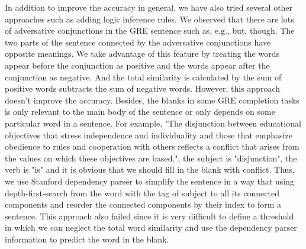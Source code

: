 \documentclass[11pt]{article}
\begin{document}
In addition to improve the accuracy in general, we have also tried several other approaches such as adding logic inference rules. We observed that there are lots of adversative conjunctions in the GRE sentence such as, e.g., but, though. The two parts of the sentence connected by the adversative conjunctions have opposite meanings. We take advantage of this feature by treating the words appear before the conjunction as positive and the words appear after the conjunction as negative. And the total similarity is calculated by the sum of positive words subtracts the sum of negative words. However, this approach doesn't improve the accuracy. Besides, the blanks in some GRE completion tasks is only relevant to the main body of the sentence or only depends on some particular word in a sentence. For example, "The disjunction between educational objectives that stress independence and individuality and those that emphasize obedience to rules and cooperation with others reflects a conflict that arises from the values on which these objectives are based.", the subject is "disjunction", the verb is "is" and it is obvious that we should fill in the blank with conflict. Thus, we use Stanford dependency parser to simplify the sentence in a way that using depth-first-search from the word with the tag of subject to all its connected components and reorder the connected components by their index to form a sentence. This approach also failed since it is very difficult to define a threshold in which we can neglect the total word similarity and use the dependency parser information to predict the word in the blank. 
\end{document}
